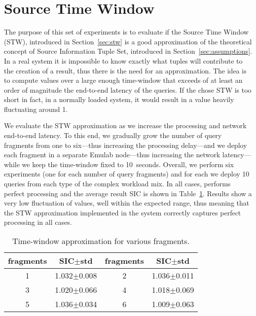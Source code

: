 \section{Source Time Window}
\label{sec:eval_stw}

The purpose of this set of experiments is to evaluate if the Source Time Window (STW), introduced in
Section~\ref{sec:stw} is a good approximation of the theoretical concept of Source Information Tuple
Set, introduced in Section~\ref{sec:assumptions}. In a real system it is impossible to know exactly what
tuples will contribute to the creation of a result, thus there is the need for an approximation. 
The idea is to compute \sic values over a large enough time-window that exceeds of at least an order of
magnitude the end-to-end latency of the queries. If the chose STW is too short in fact, in a normally
loaded system, it would result in a \sic value heavily fluctuating around 1. 

We evaluate the STW approximation as we increase the processing and network end-to-end latency.
To this end, we gradually grow the number of query fragments from one
to six---thus increasing the processing delay---and we deploy each fragment in a separate Emulab 
node---thus increasing the network latency---while we keep the time-window
fixed to 10~seconds. Overall, we perform six
experiments (\ie one for each number of query fragments) and for each we deploy
10 queries from each type of the complex workload mix. In all cases, \sys performs
perfect processing and the average result SIC is shown in Table~\ref{table:time-window}.
Results show a very low fluctuation of values, well within the expected range, thus meaning that the STW
approximation implemented in the \sys system correctly captures perfect processing in all cases.
\begin{table}[h]
  \centering
  \begin{tabular}{c|c||c|c}
    \hline
        fragments & SIC$\pm$std & fragments & SIC$\pm$std \\ \hline
	1 & 1.032$\pm$0.008 & 2 & 1.036$\pm$0.011 \\ \hline
	3 & 1.020$\pm$0.066 & 4 & 1.018$\pm$0.069 \\ \hline
	5 & 1.036$\pm$0.034 & 6 & 1.009$\pm$0.063 \\ \hline
  \end{tabular}
  \caption{Time-window approximation for various fragments.}
  \label{table:time-window}
\end{table}
